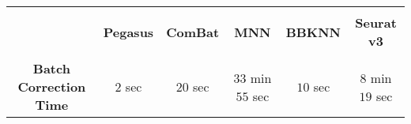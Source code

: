 \documentclass{article}
\begin{document}
\begin{center}
\begin{tabular}{|c|c|c|c|c|c|}\hline
& & & & & \\[-10pt]
 & \textbf{Pegasus} & \textbf{ComBat} & \textbf{MNN} & \textbf{BBKNN} & \textbf{Seurat v3}\\[2pt]\hline
 & & & & & \\[-10pt]
 \textbf{Batch Correction Time} & $2$ sec & $20$ sec & $33$ min $55$ sec & $10$ sec & $8$ min $19$ sec  \\[2pt]\hline
\end{tabular}
\end{center}
\end{document}
